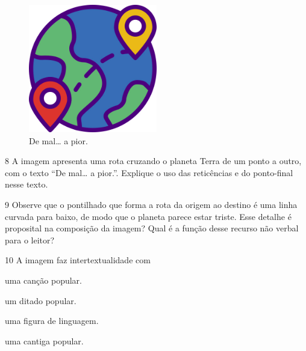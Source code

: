 \begin{figure}[H]
\centering\includegraphics[width=0.5\textwidth]{./imgSAEB_6_POR/freepik/PORT_6_IMG-17.jpeg}
\caption{De mal\ldots{} a pior.}
\end{figure}


\num{8} A imagem apresenta uma rota cruzando o planeta Terra de um ponto
a outro, com o texto ``De mal\ldots{} a pior.''. Explique o uso das
reticências e do ponto-final nesse texto.


\num{9} Observe que o pontilhado que forma a rota da origem ao destino é
uma linha curvada para baixo, de modo que o planeta parece estar triste.
Esse detalhe é proposital na composição da imagem? Qual é a função desse
recurso não verbal para o leitor?


\num{10} A imagem faz intertextualidade com

\begin{escolha}
\item uma canção popular.
\item um ditado popular. 
\item uma figura de linguagem.
\item uma cantiga popular.
\end{escolha}

